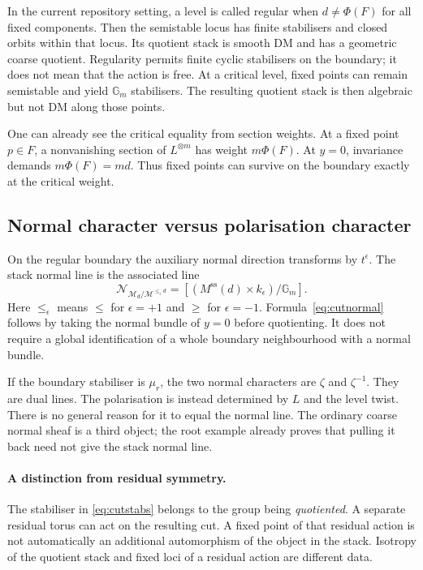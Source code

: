 \documentclass[11pt,a4paper]{article}
\numberwithin{equation}{section}
\theoremstyle{definition}
\newcommand{\Gm}{\mathbb G_m}
\newcommand{\cM}{\mathcal M}
\newcommand{\sst}{\mathrm{ss}}
\newcommand{\normal}{\mathcal N}
\newcommand{\charline}[1]{k_{#1}}
\begin{document}
In the current repository setting, a level is called regular when
$d\ne\Phi(F)$ for all fixed components. Then the semistable locus has
finite stabilisers and closed orbits within that locus. Its quotient stack
is smooth DM and has a geometric coarse quotient. Regularity permits
finite cyclic stabilisers on the boundary; it does not mean that the action
is free. At a critical level, fixed points can remain semistable and yield
$\Gm$ stabilisers. The resulting quotient stack is then algebraic but
not DM along those points.

One can already see the critical equality from section weights. At a fixed
point $p\in F$, a nonvanishing section of $L^{\otimes m}$ has weight
$m\Phi(F)$. At $y=0$, invariance demands $m\Phi(F)=md$. Thus fixed
points can survive on the boundary exactly at the critical weight.

\subsection{Normal character versus polarisation character}
On the regular boundary the auxiliary normal direction transforms by
$t^\epsilon$. The stack normal line is the associated line
\begin{equation}\label{eq:cutnormal}
 \normal_{\cM_d/\cM^{\leq_\epsilon d}}
 =[(M^{\sst}(d)\times\charline{\epsilon})/\Gm].
\end{equation}
Here $\leq_\epsilon$ means $\leq$ for $\epsilon=+1$ and $\geq$ for
$\epsilon=-1$. Formula~\eqref{eq:cutnormal} follows by taking the normal
bundle of $y=0$ before quotienting. It does not require a global
identification of a whole boundary neighbourhood with a normal bundle.

If the boundary stabiliser is $\mu_r$, the two normal characters are
$\zeta$ and $\zeta^{-1}$. They are dual lines. The polarisation is instead
determined by $L$ and the level twist. There is no general reason for it
to equal the normal line. The ordinary coarse normal sheaf is a third
object; the root example already proves that pulling it back need not
give the stack normal line.

\paragraph{A distinction from residual symmetry.}
The stabiliser in \eqref{eq:cutstabs} belongs to the group being
\emph{quotiented}. A separate residual torus can act on the resulting cut.
A fixed point of that residual action is not automatically an additional
automorphism of the object in the stack. Isotropy of the quotient stack
and fixed loci of a residual action are different data.
\end{document}
